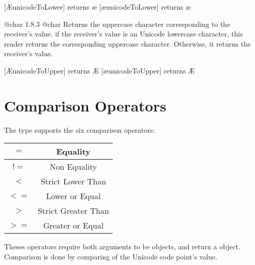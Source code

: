 \exempleDeuxLignes
{}
{[\textquotesingle\AE\textquotesingle unicodeToLower] returns \textquotesingle\ae \textquotesingle}
{[\textquotesingle\ae\textquotesingle unicodeToLower] returns \textquotesingle\ae \textquotesingle}




{@char}
{1.8.3}
{@char}
{Returns the uppercase character corresponding to the receiver's value.}
{if the receiver's value is an Unicode lowercase character, this reader returns the corresponding uppercase character. Otherwise, it returns the receiver's value.}

\exempleDeuxLignes
{}
{[\textquotesingle\AE\textquotesingle unicodeToUpper] returns \textquotesingle\AE\textquotesingle}
{[\textquotesingle\ae\textquotesingle unicodeToUpper] returns \textquotesingle\AE\textquotesingle}





\section{Comparison Operators}

The  type supports the six comparison operators:\newline

\begin{tabular}{|c|c|}
\hline
$=$ & Equality \\
\hline
$!=$ & Non Equality \\
\hline
$<$  & Strict Lower Than \\
\hline
$<=$  & Lower or Equal \\
\hline
$>$  & Strict Greater Than \\
\hline
$>=$  & Greater or Equal \\
\hline
\end{tabular}

Theses operators require both arguments to be  objects, and return a  object. Comparison is done by comparing of the Unicode code point's value.


